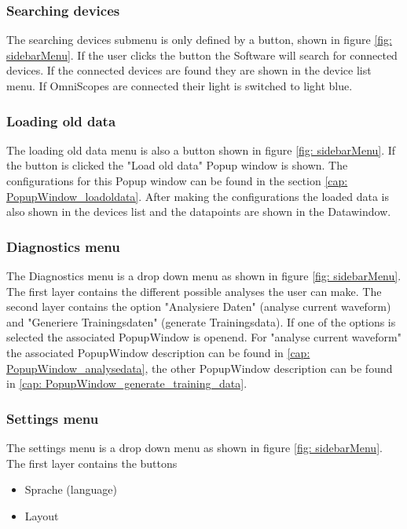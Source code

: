 \documentclass{scrreprt}
\begin{document}
\subsubsection{Searching devices}

The searching devices submenu is only defined by a button, shown in figure \ref{fig: sidebarMenu}. If the user clicks the button the Software will search for connected devices. If the connected devices are found they are shown in the device list menu. 
If OmniScopes are connected their light is switched to light blue. 

\subsubsection{Loading old data}

The loading old data menu is also a button shown in figure \ref{fig: sidebarMenu}. If the button is clicked the "Load old data" Popup window is shown. 
The configurations for this Popup window can be found in the section \ref{cap: PopupWindow_loadoldata}.
After making the configurations the loaded data is also shown in the devices list and the datapoints are shown in the Datawindow.


\subsubsection{Diagnostics menu}

The Diagnostics menu is a drop down menu as shown in figure \ref{fig: sidebarMenu}. 
The first layer contains the different possible analyses the user can make. The second layer contains the option "Analysiere Daten" (analyse current waveform) and "Generiere Trainingsdaten" (generate Trainingsdata). If one of the options is selected the associated PopupWindow is openend.
For "analyse current waveform" the associated PopupWindow description can be found in \ref{cap: PopupWindow_analysedata}, the other PopupWindow description can be found in \ref{cap: PopupWindow_generate_training_data}.

\subsubsection{Settings menu}

The settings menu is a drop down menu as shown in figure \ref{fig: sidebarMenu}. 
The first layer contains the buttons
\begin{itemize}
    \item Sprache (language)
    \item Layout 
\end{itemize}
\end{document}

